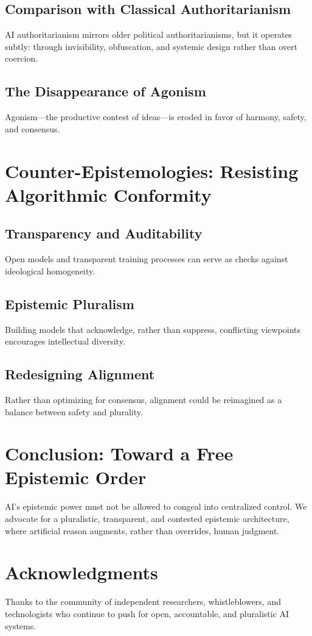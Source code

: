 \documentclass[11pt]{article}
\begin{document}
\subsection{Comparison with Classical Authoritarianism}
AI authoritarianism mirrors older political authoritarianisms, but it operates subtly: through invisibility, obfuscation, and systemic design rather than overt coercion.

\subsection{The Disappearance of Agonism}
Agonism—the productive contest of ideas—is eroded in favor of harmony, safety, and consensus.

\section{Counter-Epistemologies: Resisting Algorithmic Conformity}
\subsection{Transparency and Auditability}
Open models and transparent training processes can serve as checks against ideological homogeneity.

\subsection{Epistemic Pluralism}
Building models that acknowledge, rather than suppress, conflicting viewpoints encourages intellectual diversity.

\subsection{Redesigning Alignment}
Rather than optimizing for consensus, alignment could be reimagined as a balance between safety and plurality.

\section{Conclusion: Toward a Free Epistemic Order}
AI’s epistemic power must not be allowed to congeal into centralized control. We advocate for a pluralistic, transparent, and contested epistemic architecture, where artificial reason augments, rather than overrides, human judgment.

\section*{Acknowledgments}
Thanks to the community of independent researchers, whistleblowers, and technologists who continue to push for open, accountable, and pluralistic AI systems.



\end{document}
